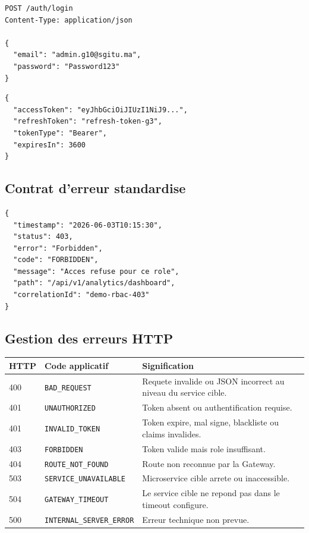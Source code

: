 \documentclass[12pt,a4paper]{article}
\begin{document}
\begin{lstlisting}[style=code]
POST /auth/login
Content-Type: application/json

{
  "email": "admin.g10@sgitu.ma",
  "password": "Password123"
}
\end{lstlisting}

\begin{lstlisting}[style=code]
{
  "accessToken": "eyJhbGciOiJIUzI1NiJ9...",
  "refreshToken": "refresh-token-g3",
  "tokenType": "Bearer",
  "expiresIn": 3600
}
\end{lstlisting}

\subsection{Contrat d'erreur standardise}

\begin{lstlisting}[style=code]
{
  "timestamp": "2026-06-03T10:15:30",
  "status": 403,
  "error": "Forbidden",
  "code": "FORBIDDEN",
  "message": "Acces refuse pour ce role",
  "path": "/api/v1/analytics/dashboard",
  "correlationId": "demo-rbac-403"
}
\end{lstlisting}

\subsection{Gestion des erreurs HTTP}

\begin{longtable}{p{2cm}p{4cm}p{8.5cm}}
\toprule
\textbf{HTTP} & \textbf{Code applicatif} & \textbf{Signification} \\
\midrule
400 & \texttt{BAD\_REQUEST} & Requete invalide ou JSON incorrect au niveau du service cible. \\
401 & \texttt{UNAUTHORIZED} & Token absent ou authentification requise. \\
401 & \texttt{INVALID\_TOKEN} & Token expire, mal signe, blackliste ou claims invalides. \\
403 & \texttt{FORBIDDEN} & Token valide mais role insuffisant. \\
404 & \texttt{ROUTE\_NOT\_FOUND} & Route non reconnue par la Gateway. \\
503 & \texttt{SERVICE\_UNAVAILABLE} & Microservice cible arrete ou inaccessible. \\
504 & \texttt{GATEWAY\_TIMEOUT} & Le service cible ne repond pas dans le timeout configure. \\
500 & \texttt{INTERNAL\_SERVER\_ERROR} & Erreur technique non prevue. \\
\bottomrule
\end{longtable}
\end{document}
